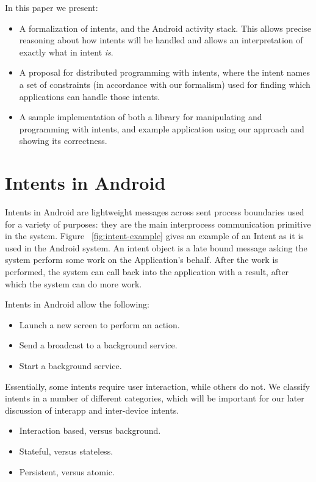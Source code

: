 \documentclass{acm_proc_article-sp}
\begin{document}
In this paper we present:

\begin{itemize}
\item A formalization of intents, and the Android activity stack.
  This allows precise reasoning about how intents will be handled and
  allows an interpretation of exactly what in intent \emph{is}.

\item A proposal for distributed programming with intents, where the
  intent names a set of constraints (in accordance with our formalism)
  used for finding which applications can handle those intents.

\item A sample implementation of both a library for manipulating and
  programming with intents, and example application using our approach
  and showing its correctness.

\end{itemize}

\section{Intents in Android}
\label{sec:intent-overview}

Intents in Android are lightweight messages across sent process
boundaries used for a variety of purposes: they are the main
interprocess communication primitive in the system. Figure
~\ref{fig:intent-example} gives an example of an Intent as it is used
in the Android system.  An intent object is a late bound message
asking the system perform some work on the Application's behalf.
After the work is performed, the system can call back into the
application with a result, after which the system can do more work.

Intents in Android allow the following:

\begin{itemize}
\item Launch a new screen to perform an action.
\item Send a broadcast to a background service.
\item Start a background service.
\end{itemize}

Essentially, some intents require user interaction, while others do
not.  We classify intents in a number of different categories, which
will be important for our later discussion of interapp and
inter-device intents.

\begin{itemize}
\item Interaction based, versus background.
\item Stateful, versus stateless.
\item Persistent, versus atomic.
\end{itemize}
\end{document}
